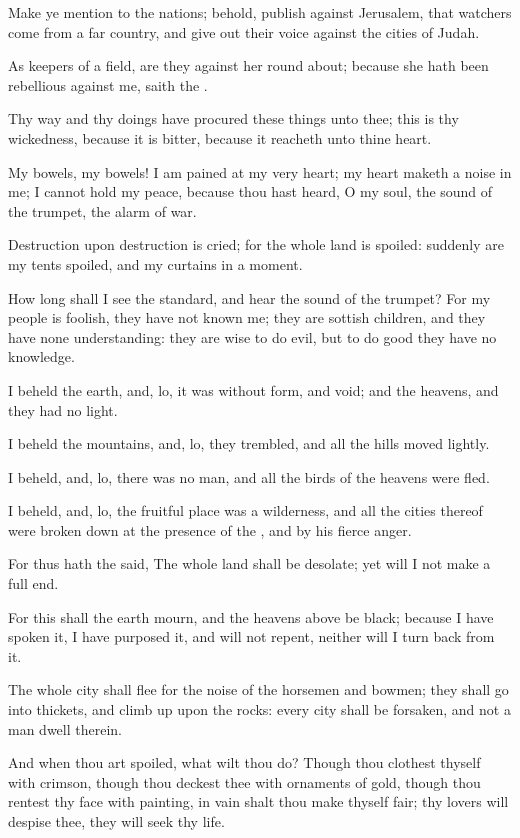 \verse Make ye mention to the nations; behold, publish against Jerusalem, that watchers come from a far country, and give out their voice against the cities of Judah.

\verse As keepers of a field, are they against her round about; because she hath been rebellious against me, saith the \LORD.

\verse Thy way and thy doings have procured these things unto thee; this is thy wickedness, because it is bitter, because it reacheth unto thine heart.

\verse My bowels, my bowels! I am pained at my very heart; my heart maketh a noise in me; I cannot hold my peace, because thou hast heard, O my soul, the sound of the trumpet, the alarm of war.

\verse Destruction upon destruction is cried; for the whole land is spoiled: suddenly are my tents spoiled, and my curtains in a moment.

\verse How long shall I see the standard, and hear the sound of the trumpet?  \verse For my people is foolish, they have not known me; they are sottish children, and they have none understanding: they are wise to do evil, but to do good they have no knowledge.

\verse I beheld the earth, and, lo, it was without form, and void; and the heavens, and they had no light.

\verse I beheld the mountains, and, lo, they trembled, and all the hills moved lightly.

\verse I beheld, and, lo, there was no man, and all the birds of the heavens were fled.

\verse I beheld, and, lo, the fruitful place was a wilderness, and all the cities thereof were broken down at the presence of the \LORD, and by his fierce anger.

\verse For thus hath the \LORD said, The whole land shall be desolate; yet will I not make a full end.

\verse For this shall the earth mourn, and the heavens above be black; because I have spoken it, I have purposed it, and will not repent, neither will I turn back from it.

\verse The whole city shall flee for the noise of the horsemen and bowmen; they shall go into thickets, and climb up upon the rocks: every city shall be forsaken, and not a man dwell therein.

\verse And when thou art spoiled, what wilt thou do? Though thou clothest thyself with crimson, though thou deckest thee with ornaments of gold, though thou rentest thy face with painting, in vain shalt thou make thyself fair; thy lovers will despise thee, they will seek thy life.

